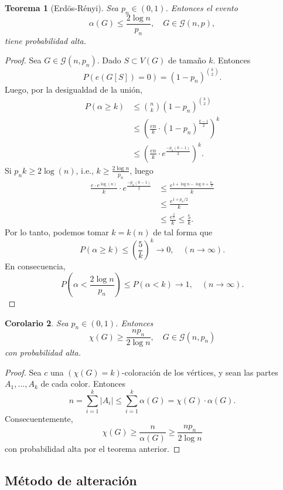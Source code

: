 \documentclass[12pt]{report}
\theoremstyle{plain}
\newtheorem{theorem}{Teorema}[section]
\newtheorem{corollary}[theorem]{Corolario}
\theoremstyle{definition}
\newcommand{\abs}[1]{\left \vert #1 \right \vert}
\begin{document}
\begin{theorem}[Erdös-Rényi]
Sea $p_n \in (0,1)$. Entonces el evento
\[
    \alpha (G) \leq \frac{2 \log n}{p_n}, \quad G \in \mathcal G(n,p),
\]
tiene probabilidad alta.
\end{theorem}
\begin{proof}
Sea $G \in \mathcal G (n,p_n)$. Dado $S \subset V(G)$ de tamaño $k$. Entonces
\[
    P(e(G[S]) = 0) = (1-p_n)^{\binom k 2}.
\]
Luego, por la desigualdad de la unión,
\begin{align*}
P(\alpha \geq k) &\leq \binom n k (1-p_n)^{\binom k 2} \\
&\leq \left ( \frac {en}{k} \cdot (1-p_n)^{\frac{k-1}2} \right )^k \\
&\leq \left ( \frac {en}k \cdot e^{\frac{-p_n(k-1)}{2}} \right )^k.
\end{align*}
Si $p_nk \geq 2 \log (n)$, i.e., $k \geq \frac{2 \log n }{p_n}$, luego
\begin{align*}
\frac{e \cdot e^{\log (n)}}{k} \cdot e^{\frac{-p_n (k-1)}{2}} &\leq \frac{e^{1 + \log n - \log n + \frac {p_n} 2}}{k} \\
&\leq \frac{e^{1 + p_n/2}}{k} \\
&\leq \frac {e^{\frac 3 2}}{k} \leq \frac 5 k.
\end{align*}
Por lo tanto, podemos tomar $k=k(n)$ de tal forma que
\[
    P(\alpha \geq k) \leq \left ( \frac 5 k \right )^k \longrightarrow 0, \quad (n \to \infty).
\]
En consecuencia,
\[
    P(\alpha < \frac{2 \log n}{p_n}) \leq P(\alpha < k) \longrightarrow 1, \quad (n \to \infty).
\]
\end{proof}


\begin{corollary}
Sea $p_n \in (0,1)$. Entonces
\[
    \chi (G) \geq \frac{n p_n}{2 \log n} , \quad G \in \mathcal G (n,p_n)
\]
con probabilidad alta.
\end{corollary}
\begin{proof}
Sea $c$ una $(\chi (G) = k)$-coloración de los vértices, y sean las partes $A_1, \ldots, A_k$ de cada color. Entonces
\[
    n = \sum_{i = 1}^k \abs{A_i} \leq \sum_{i = 1}^k \alpha (G) = \chi (G) \cdot \alpha (G).
\]
Consecuentemente,
\[
    \chi (G) \geq \frac{n}{\alpha (G)} \geq \frac{n p_n}{2 \log n}
\]
con probabilidad alta por el teorema anterior.
\end{proof}


\subsection{Método de alteración}
\end{document}
